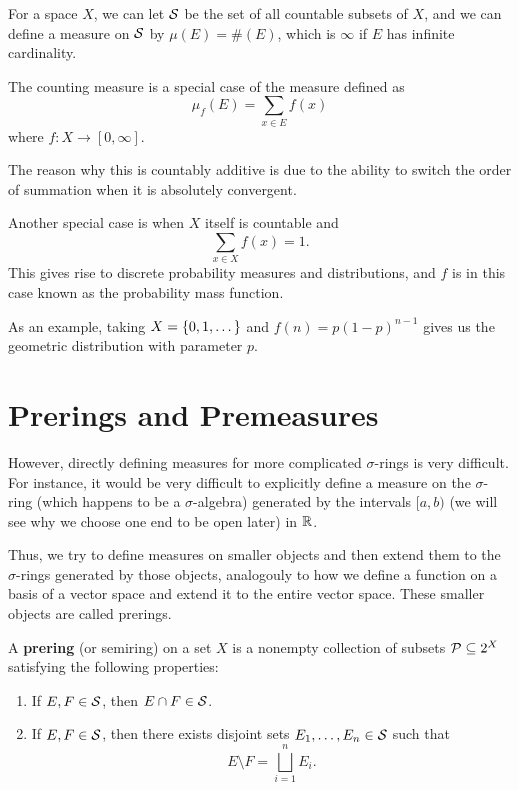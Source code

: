 \begin{example}
    For a space $X$, we can let $\mathcal S$ be the set of all countable subsets of $X$, and we can define a measure on $\mathcal S$ by $\mu(E) = \#(E)$, which is $\infty$ if $E$ has infinite cardinality.
\end{example}

\begin{example}
    The counting measure is a special case of the measure defined as \[\mu_f(E) = \sum_{x \in E} f(x) \]where $f \colon X \to [0, \infty]$.

    The reason why this is countably additive is due to the ability to switch the order of summation when it is absolutely convergent.
\end{example}

\begin{example}
    Another special case is when $X$ itself is countable and \[ \sum_{x \in X} f(x) = 1.\] This gives rise to discrete probability measures and distributions, and $f$ is in this case known as the probability mass function. 

    As an example, taking $X = \qty{0, 1, \dots}$ and $f(n) = p(1 - p)^{n - 1}$ gives us the geometric distribution with parameter $p$.
\end{example}

\section{Prerings and Premeasures}

However, directly defining measures for more complicated $\sigma$-rings is very difficult. For instance, it would be very difficult to explicitly define a measure on the $\sigma$-ring (which happens to be a $\sigma$-algebra) generated by the intervals $[a, b)$ (we will see why we choose one end to be open later) in $\mathbb R$.

Thus, we try to define measures on smaller objects and then extend them to the $\sigma$-rings generated by those objects, analogouly to how we define a function on a basis of a vector space and extend it to the entire vector space. These smaller objects are called prerings.

\begin{definition}
    A \textbf{prering} (or semiring) on a set $X$ is a nonempty collection of subsets $\mathcal P \subseteq 2^X$ satisfying the following properties:
    \begin{enumerate}
        \item If $E, F \in \mathcal S$, then $E \cap F \in \mathcal S$.
        \item If $E, F \in \mathcal S$, then there exists disjoint sets $E_1, \dots, E_n \in \mathcal S$ such that \[E \setminus F = \bigsqcup_{i = 1}^n E_i.\]
    \end{enumerate}
\end{definition}


